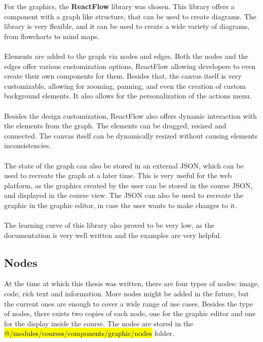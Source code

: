 \noindent For the graphics, the \textbf{ReactFlow} library \cite{reactflow} was chosen. This library offers a component with a graph like structure, that can be used to create diagrams. The library is very flexible, and it can be used to create a wide variety of diagrams, from flowcharts to mind maps.
\\\\\newpage
\noindent Elements are added to the graph via nodes and edges. Both the nodes and the edges offer various customization options, ReactFlow allowing developers to even create their own components for them. Besides that, the canvas itself is very customizable, allowing for zooming, panning, and even the creation of custom background elements. It also allows for the personalization of the actions menu.
\\\\
\noindent Besides the design customization, ReactFlow also offers dynamic interaction with the elements from the graph. The elements can be dragged, resized and connected. The canvas itself can be dynamically resized without causing elements inconsistencies.
\\\\
\noindent The state of the graph can also be stored in an external JSON, which can be used to recreate the graph at a later time. This is very useful for the web platform, as the graphics created by the user can be stored in the course JSON, and displayed in the course view. The JSON can also be used to recreate the graphic in the graphic editor, in case the user wants to make changes to it.
\\\\
\noindent The learning curve of this library also proved to be very low, as the documentation is very well written and the examples are very helpful.

\subsection{Nodes}

\noindent At the time at which this thesis was written, there are four types of nodes: image, code, rich text and information. More nodes might be added in the future, but the current ones are enough to cover a wide range of use cases. Besides the type of nodes, there exists two copies of each node, one for the graphic editor and one for the display inside the course. The nodes are stored in the \hl{@/modules/courses/components/graphic/nodes} folder.

